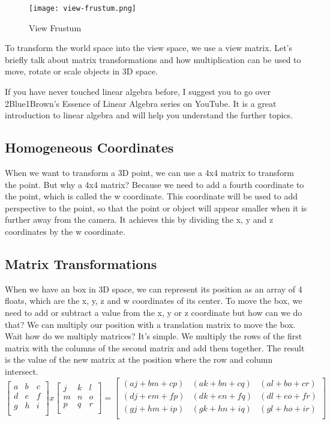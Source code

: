 \documentclass[12pt]{report} \usepackage{preamble}
\begin{document}
\begin{figure}[hbtp]
	\centering \texttt{[image: view-frustum.png]}
	\caption{View Frustum \cite{fig:view-frustum}}
\end{figure}
\FloatBarrier

To transform the world space into the view space, we use a view matrix.
Let's briefly talk about matrix transformations and how multiplication
can be used to move, rotate or scale objects in 3D space.

If you have never touched linear algebra before, I suggest you to go over
2Blue1Brown's Essence of Linear Algebra series on YouTube. It is a great
introduction to linear algebra and will help you understand the further topics.

\subsection{Homogeneous Coordinates}

When we want to transform a 3D point, we can use a 4x4 matrix to
transform the point. But why a 4x4 matrix? Because we need to add a
fourth coordinate to the point, which is called the w coordinate. This
coordinate will be used to add perspective to the point, so
that the point or object will appear smaller when it is further away
from the camera. It achieves this by dividing the x, y and z coordinates
by the w coordinate.

\subsection{Matrix Transformations}

When we have an box in 3D space, we can represent its position as an
array of 4 floats, which are the x, y, z and w coordinates of its center.
To move the box, we need to add or subtract a value from the x, y or
z coordinate but how can we do that? We can multiply our position with a translation matrix to
move the box. Wait how do we multiply matrices? It's simple. We multiply
the rows of the first matrix with the columns of the second matrix and add them
together. The result is the value of the new matrix at the position where the row and
column intersect.
\[
	\begin{bmatrix}
		a & b & c \\
		d & e & f \\
		g & h & i \\
	\end{bmatrix}
	x
	\begin{bmatrix}
		j & k & l \\
		m & n & o \\
		p & q & r \\
	\end{bmatrix}
	=
	\begin{bmatrix}
		(aj + bm + cp) & (ak + bn + cq) & (al + bo + cr) \\
		(dj + em + fp) & (dk + en + fq) & (dl + eo + fr) \\
		(gj + hm + ip) & (gk + hn + iq) & (gl + ho + ir) \\
	\end{bmatrix}
\]
\end{document}
